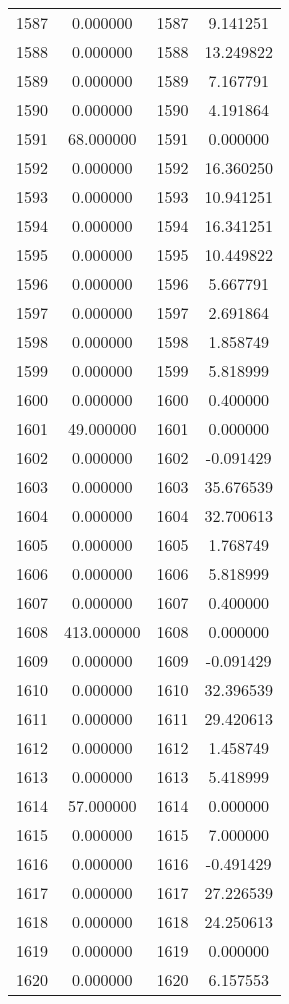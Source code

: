\documentclass[12pt]{article}
\begin{document}
\begin{longtable}{@{}cccc@{}}
1587 & 0.000000 & 1587 & 9.141251 \\
1588 & 0.000000 & 1588 & 13.249822 \\
1589 & 0.000000 & 1589 & 7.167791 \\
1590 & 0.000000 & 1590 & 4.191864 \\
1591 & 68.000000 & 1591 & 0.000000 \\
1592 & 0.000000 & 1592 & 16.360250 \\
1593 & 0.000000 & 1593 & 10.941251 \\
1594 & 0.000000 & 1594 & 16.341251 \\
1595 & 0.000000 & 1595 & 10.449822 \\
1596 & 0.000000 & 1596 & 5.667791 \\
1597 & 0.000000 & 1597 & 2.691864 \\
1598 & 0.000000 & 1598 & 1.858749 \\
1599 & 0.000000 & 1599 & 5.818999 \\
1600 & 0.000000 & 1600 & 0.400000 \\
1601 & 49.000000 & 1601 & 0.000000 \\
1602 & 0.000000 & 1602 & -0.091429 \\
1603 & 0.000000 & 1603 & 35.676539 \\
1604 & 0.000000 & 1604 & 32.700613 \\
1605 & 0.000000 & 1605 & 1.768749 \\
1606 & 0.000000 & 1606 & 5.818999 \\
1607 & 0.000000 & 1607 & 0.400000 \\
1608 & 413.000000 & 1608 & 0.000000 \\
1609 & 0.000000 & 1609 & -0.091429 \\
1610 & 0.000000 & 1610 & 32.396539 \\
1611 & 0.000000 & 1611 & 29.420613 \\
1612 & 0.000000 & 1612 & 1.458749 \\
1613 & 0.000000 & 1613 & 5.418999 \\
1614 & 57.000000 & 1614 & 0.000000 \\
1615 & 0.000000 & 1615 & 7.000000 \\
1616 & 0.000000 & 1616 & -0.491429 \\
1617 & 0.000000 & 1617 & 27.226539 \\
1618 & 0.000000 & 1618 & 24.250613 \\
1619 & 0.000000 & 1619 & 0.000000 \\
1620 & 0.000000 & 1620 & 6.157553 \\

\end{longtable}
\end{document}
